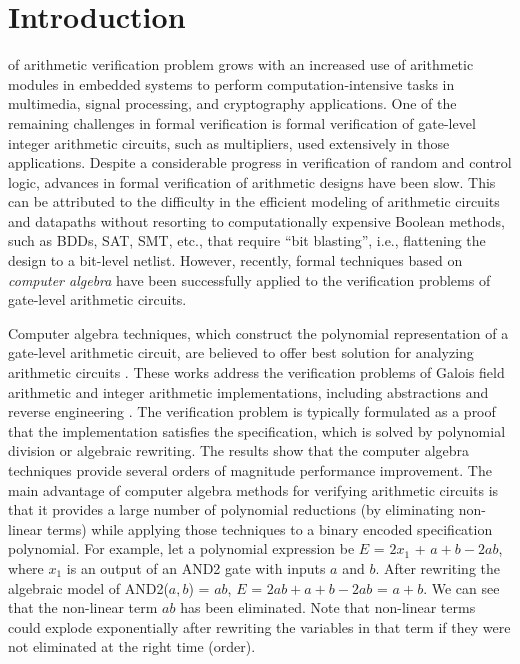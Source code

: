 \section{Introduction}

 of arithmetic verification problem grows with an increased use of arithmetic modules in embedded systems to perform computation-intensive tasks in multimedia, signal processing, and cryptography applications. 
One of the remaining challenges in formal verification is formal verification of gate-level integer arithmetic circuits, such as multipliers, used extensively in those applications. Despite a considerable progress in verification of random and control logic, advances in formal verification of arithmetic designs have been slow. This can be attributed to the difficulty in the efficient modeling of arithmetic circuits and datapaths without resorting to computationally expensive Boolean methods, such as BDDs, SAT, SMT, etc., that require ``bit blasting'', i.e., flattening the design to a bit-level netlist. However, recently, formal techniques based on \textit{computer algebra} have been successfully applied to the verification problems of gate-level arithmetic circuits.

Computer algebra techniques, which construct the polynomial representation of a gate-level arithmetic circuit, are believed to offer best solution for analyzing arithmetic circuits \cite{ciesielski2015verification}\cite{kalla:tcad13}\cite{STABLE:date11}\cite{sayedformal:date-2016}. These works address the verification problems of Galois field arithmetic and integer arithmetic implementations, including abstractions and reverse engineering \cite{STABLE:date11}\cite{sayedformal:date-2016}\cite{ciesielski2015verification}. The verification problem is typically formulated as a proof that the implementation satisfies the specification, which is solved by polynomial division or algebraic rewriting. The results show that the computer algebra techniques provide several orders of magnitude performance improvement. The main advantage of computer algebra methods for verifying arithmetic circuits is that it provides a large number of polynomial reductions (by eliminating non-linear terms) while applying those techniques to a binary encoded specification polynomial. For example, let a polynomial expression be $E$ = $2x_1$ + $a + b - 2ab$, where $x_1$ is an output of an AND2 gate with inputs $a$ and $b$. After rewriting the algebraic model of AND2($a, b$) = $ab$, $E$ = $2ab + a + b - 2ab$ = $a + b$. We can see that the non-linear term $ab$ has been eliminated. Note that non-linear terms could explode exponentially after rewriting the variables in that term if they were not eliminated at the right time (order).

